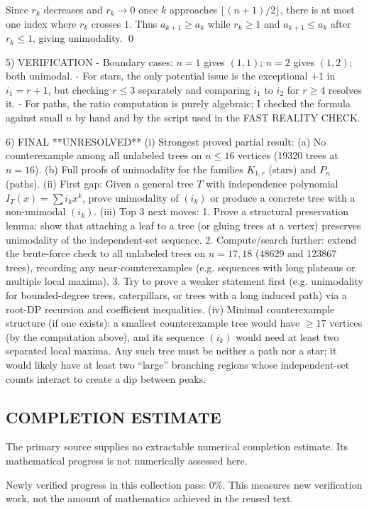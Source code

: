 Since $r_k$ decreases and $r_k\to 0$ once $k$ approaches $\lfloor (n+1)/2\rfloor$, there is at most one index where $r_k$ crosses $1$.  Thus $a_{k+1}\ge a_k$ while $r_k\ge 1$ and $a_{k+1}\le a_k$ after $r_k\le 1$, giving unimodality.  \qed

5) VERIFICATION
- Boundary cases: $n=1$ gives $(1,1)$; $n=2$ gives $(1,2)$; both unimodal.
- For stars, the only potential issue is the exceptional $+1$ in $i_1=r+1$, but checking $r\le 3$ separately and comparing $i_1$ to $i_2$ for $r\ge 4$ resolves it.
- For paths, the ratio computation is purely algebraic; I checked the formula against small $n$ by hand and by the script used in the FAST REALITY CHECK.

6) FINAL
**UNRESOLVED**
(i) Strongest proved partial result: (a) No counterexample among all unlabeled trees on $n\le 16$ vertices (19320 trees at $n=16$). (b) Full proofs of unimodality for the families $K_{1,r}$ (stars) and $P_n$ (paths).
(ii) First gap: Given a general tree $T$ with independence polynomial $I_T(x)=\sum i_k x^k$, prove unimodality of $(i_k)$ or produce a concrete tree with a non-unimodal $(i_k)$.
(iii) Top 3 next moves:
  1. Prove a structural preservation lemma: show that attaching a leaf to a tree (or gluing trees at a vertex) preserves unimodality of the independent-set sequence.
  2. Compute/search further: extend the brute-force check to all unlabeled trees on $n=17,18$ (48629 and 123867 trees), recording any near-counterexamples (e.g. sequences with long plateaus or multiple local maxima).
  3. Try to prove a weaker statement first (e.g. unimodality for bounded-degree trees, caterpillars, or trees with a long induced path) via a root-DP recursion and coefficient inequalities.
(iv) Minimal counterexample structure (if one exists): a smallest counterexample tree would have $\ge 17$ vertices (by the computation above), and its sequence $(i_k)$ would need at least two separated local maxima.  Any such tree must be neither a path nor a star; it would likely have at least two ``large'' branching regions whose independent-set counts interact to create a dip between peaks.




\subsection*{COMPLETION ESTIMATE}
The primary source supplies no extractable numerical completion estimate. Its mathematical progress is not numerically assessed here.

Newly verified progress in this collection pass: $0\%$. This measures new verification work, not the amount of mathematics achieved in the reused text.
